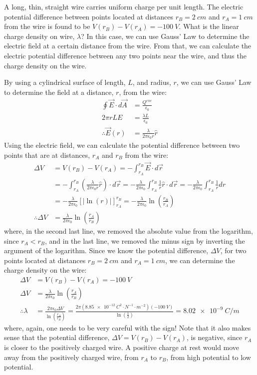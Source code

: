 \begin{example}{A long, thin, straight wire carries uniform charge per unit length. The electric potential difference between points located at distances $r_B=\SI{2}{cm}$ and $r_A=\SI{1}{cm}$ from the wire is found to be $V(r_B)-V(r_A)=\SI{-100}{V}$. What is the linear charge density on wire, $\lambda$?}
In this case, we can use Gauss' Law to determine the electric field at a certain distance from the wire. From that, we can calculate the electric potential difference between any two points near the wire, and thus the charge density on the wire.

By using a cylindrical surface of length, $L$, and radius, $r$, we can use Gauss' Law to determine the field at a distance, $r$, from the wire:
\begin{align*}
\oint \vec E\cdot d\vec A&=\frac{Q^{enc}}{\epsilon_0}\\
2\pi r L E&= \frac{\lambda L}{\epsilon_0}\\
\therefore \vec E(r)&=\frac{\lambda}{2\pi\epsilon_0 r}\hat r
\end{align*}
Using the electric field, we can calculate the potential difference between two points that are at distances, $r_A$ and $r_B$ from the wire:
\begin{align*}
\Delta V &=V(r_B)-V(r_A)=-\int_{r_A}^{r_B}  \vec E\cdot d\vec r\\
&=-\int_{r_A}^{r_B}  \left( \frac{\lambda}{2\pi\epsilon_0 r}\hat r \right)\cdot d\vec r=-\frac{\lambda}{2\pi\epsilon_0}\int_{r_A}^{r_B}   \frac{1}{r}\hat r \cdot d\vec r=-\frac{\lambda}{2\pi\epsilon_0}\int_{r_A}^{r_B}   \frac{1}{r}dr\\
&=-\frac{\lambda}{2\pi\epsilon_0}\left[|\ln(r)|\right]_{r_A}^{r_B} = -\frac{\lambda}{2\pi\epsilon_0}\ln\left(\frac{r_B}{r_A}\right)\\
\therefore\Delta V &=\frac{\lambda}{2\pi\epsilon_0}\ln\left(\frac{r_A}{r_B}\right)
\end{align*}
where, in the second last line, we removed the absolute value from the logarithm, since $r_A<r_B$, and in the last line, we removed the minus sign by inverting the argument of the logarithm. Since we know the potential difference, $\Delta V$, for two points located at distances $r_B=\SI{2}{cm}$ and $r_A=\SI{1}{cm}$, we can determine the charge density on the wire:
\begin{align*}
\Delta V &=V(r_B)-V(r_A)=\SI{-100}{V}\\
\Delta V &=\frac{\lambda}{2\pi\epsilon_0}\ln\left(\frac{r_A}{r_B}\right)\\
\therefore \lambda &= \frac{2\pi\epsilon_0\Delta V}{\ln\left(\frac{r_A}{r_B}\right)}=\frac{2\pi(\SI{8.85e-12}{C^2\cdot N^{-1}\cdot m^{-2}})(\SI{-100}{V})}{\ln\left(\frac{1}{2}\right)}=\SI{8.02e-9}{C/m}
\end{align*}
where, again, one needs to be very careful with the sign! Note that it also makes sense that the potential difference, $\Delta V =V(r_B)-V(r_A)$, is negative, since $r_A$ is closer to the positively charged wire. A positive charge at rest would move away from the positively charged wire, from $r_A$ to $r_B$, from high potential to low potential.


\end{example}
